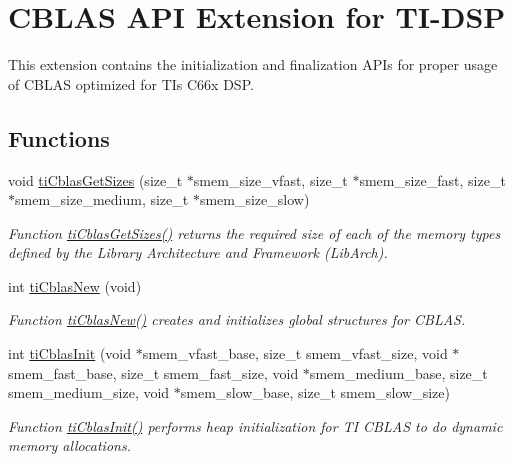 \hypertarget{group__ti__cblas__api}{}\section{C\+B\+L\+A\+S A\+P\+I Extension for T\+I-\/\+D\+S\+P}
\label{group__ti__cblas__api}


This extension contains the initialization and finalization A\+P\+Is for proper usage of C\+B\+L\+A\+S optimized for T\+I\textquotesingle{}s C66x D\+S\+P.  


\subsection*{Functions}
\begin{DoxyCompactItemize}
\item 
void \hyperlink{group__ti__cblas__api_gae0fdf3561c8f8990b12eefaff5963e7e}{ti\+Cblas\+Get\+Sizes} (size\+\_\+t $\ast$smem\+\_\+size\+\_\+vfast, size\+\_\+t $\ast$smem\+\_\+size\+\_\+fast, size\+\_\+t $\ast$smem\+\_\+size\+\_\+medium, size\+\_\+t $\ast$smem\+\_\+size\+\_\+slow)
\begin{DoxyCompactList}\small\item\em Function \hyperlink{group__ti__cblas__api_gae0fdf3561c8f8990b12eefaff5963e7e}{ti\+Cblas\+Get\+Sizes()} returns the required size of each of the memory types defined by the Library Architecture and Framework (Lib\+Arch). \end{DoxyCompactList}\item 
int \hyperlink{group__ti__cblas__api_gad9c3d0709709d5c3303988e3616fb205}{ti\+Cblas\+New} (void)
\begin{DoxyCompactList}\small\item\em Function \hyperlink{group__ti__cblas__api_gad9c3d0709709d5c3303988e3616fb205}{ti\+Cblas\+New()} creates and initializes global structures for C\+B\+L\+A\+S. \end{DoxyCompactList}\item 
int \hyperlink{group__ti__cblas__api_ga4757d903bc3509fd5c328317c9a72dd7}{ti\+Cblas\+Init} (void $\ast$smem\+\_\+vfast\+\_\+base, size\+\_\+t smem\+\_\+vfast\+\_\+size, void $\ast$smem\+\_\+fast\+\_\+base, size\+\_\+t smem\+\_\+fast\+\_\+size, void $\ast$smem\+\_\+medium\+\_\+base, size\+\_\+t smem\+\_\+medium\+\_\+size, void $\ast$smem\+\_\+slow\+\_\+base, size\+\_\+t smem\+\_\+slow\+\_\+size)
\begin{DoxyCompactList}\small\item\em Function \hyperlink{group__ti__cblas__api_ga4757d903bc3509fd5c328317c9a72dd7}{ti\+Cblas\+Init()} performs heap initialization for T\+I C\+B\+L\+A\+S to do dynamic memory allocations. \end{DoxyCompactList}\item 

\end{DoxyCompactItemize}
